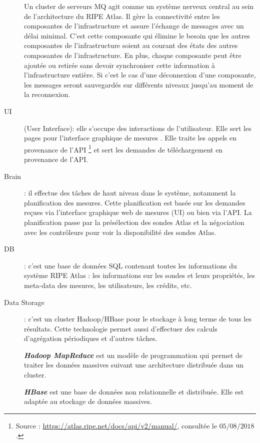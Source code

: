 \begin{description}
	Un cluster de serveurs MQ  agit comme un système nerveux central au sein de l'architecture du RIPE Atlas. Il gère la connectivité entre les composantes de l'infrastructure et  assure l'échange de messages avec un délai minimal. C'est cette composante qui élimine le besoin que les autres composantes de l'infrastructure soient au courant des états des autres composantes de l'infrastructure. En plus, chaque composante peut être ajoutée ou retirée sans devoir synchroniser cette information à l'infrastructure entière. Si c'est le cas d'une déconnexion d'une composante, les messages seront sauvegardés sur différents niveaux jusqu'au moment de la reconnexion.
	
	
	
	\item [UI] (User Interface): elle s'occupe des interactions de l'utilisateur. Elle sert les pages pour l'interface graphique de mesures \cite{create-UDM}. Elle traite les appels en provenance de l'API \footnote{Source : \url{https://atlas.ripe.net/docs/api/v2/manual/}, consultée le $05/08/2018$.} et sert les demandes de téléchargement en provenance de l'API.
	
	\item [Brain] : il effectue des tâches de haut niveau dans le système, notamment la planification des mesures. Cette planification est basée sur les demandes reçues via l'interface graphique web de mesures (UI) ou bien via l'API. La planification passe par la  présélection des sondes Atlas et la négociation avec les contrôleurs pour voir la disponibilité des sondes Atlas. 
	
	
	\item [DB] : c'est une base de données SQL contenant toutes les informations du système RIPE Atlas : les informations sur les sondes et leurs propriétés, les meta-data des mesures, les utilisateurs, les crédits, etc. 
	
	\item [Data Storage] : c'est un cluster Hadoop/HBase pour le stockage à long terme de tous les résultats. Cette technologie permet aussi d'effectuer des calculs d'agrégation périodiques et  d'autres tâches. 
	
	
	\begin{tcolorbox}
		\textbf{\textit{Hadoop MapReduce}} est un modèle de programmation qui permet de traiter les données massives suivant une architecture distribuée dans un cluster.
		
		\textbf{\textit{HBase}} est une base de données non relationnelle et distribuée. Elle est adaptée au stockage de données massives.
	\end{tcolorbox} 
	
\end{description}


